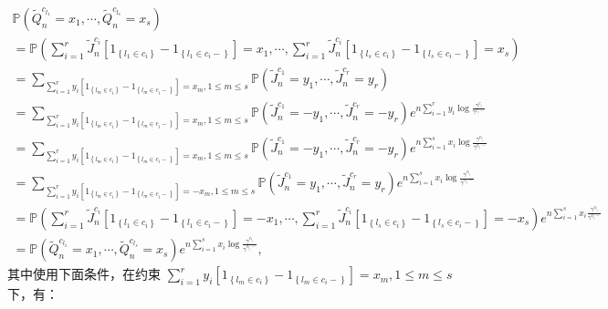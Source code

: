 \begin{equation*}
\begin{array}{l}
    \mathbb{P}\left(\tilde{Q}_{n}^{c_{l_{1}}}=x_{1}, \cdots, \tilde{Q}_{n}^{c_{l_{s}}}=x_{s}\right)\\
    =\mathbb{P}\left(\sum_{i=1}^{r} \tilde{J}_{n}^{c_{i}}\left[1_{\left\{l_{1} \in c_{i}\right\}}-1_{\left\{l_{1} \in c_{i}-\right\}}\right]=x_{1}, \cdots, \sum_{i=1}^{r} \tilde{J}_{n}^{c_{i}}\left[1_{\left\{l_{s} \in c_{i}\right\}}-1_{\left\{l_{s} \in c_{i}-\right\}}\right]=x_{s}\right)\\
    =\sum_{\sum_{i=1}^{r} y_{i}\left[1_{\left\{l_{m} \in c_{i}\right\}}-1_{\left\{l_{m} \in c_{i}-\right\}}\right]=x_{m}, 1 \leq m \leq s} \mathbb{P}\left(\tilde{J}_{n}^{c_{1}}=y_{1}, \cdots, \tilde{J}_{n}^{c_{r}}=y_{r}\right)\\
    =\sum_{\sum_{i=1}^{r} y_{i}\left[1_{\left\{l_{m} \in c_{i}\right\}}-1_{\left\{l_{m} \in c_{i}-\right\}}\right]=x_{m}, 1 \leq m \leq s} \mathbb{P}\left(\tilde{J}_{n}^{c_{1}}=-y_{1}, \cdots, \tilde{J}_{n}^{c_{r}}=-y_{r}\right) e^{n \sum_{i=1}^{r} y_{i} \log \frac{\gamma^{c_{i}}}{\gamma^{c_{i}-}}}\\
    =\sum_{\sum_{i=1}^{r} y_{i}\left[1_{\left\{l_{m} \in c_{i}\right\}}-1_{\left\{l_{m} \in c_{i}-\right\}}\right]=x_{m}, 1 \leq m \leq s} \mathbb{P}\left(\tilde{J}_{n}^{c_{1}}=-y_{1}, \cdots, \tilde{J}_{n}^{c_{r}}=-y_{r}\right) e^{n \sum_{i=1}^{s} x_{i} \log \frac{\gamma^{c_{l_i}}}{\gamma^{c_{l_i}-}}}\\
    =\sum_{\sum_{i=1}^{r} y_{i}\left[1_{\left\{l_{m} \in c_{i}\right\}}-1_{\left\{l_{m} \in c_{i}-\right\}}\right]=-x_{m}, 1 \leq m \leq s} \mathbb{P}\left(\tilde{J}_{n}^{c_{1}}=y_{1}, \cdots, \tilde{J}_{n}^{c_{r}}=y_{r}\right) e^{n \sum_{i=1}^{s} x_{i} \log \frac{\gamma^{c_{l_i}}}{\gamma^{c_{l_i}-}}}\\
    =\mathbb{P}\left(\sum_{i=1}^{r} \tilde{J}_{n}^{c_{i}}\left[1_{\left\{l_{1} \in c_{i}\right\}}-1_{\left\{l_{1} \in c_{i}-\right\}}\right]=-x_{1}, \cdots, \sum_{i=1}^{r} \tilde{J}_{n}^{c_{i}}\left[1_{\left\{l_{s} \in c_{i}\right\}}-1_{\left\{l_{s} \in c_{i}-\right\}}\right]=-x_{s}\right) e^{n \sum_{i=1}^{s} x_{i} \frac{\gamma^{c_{l_i}}}{\gamma^{c_{l_i}-}}}\\
    =\mathbb{P}\left(\tilde{Q}_{n}^{c_{l_{1}}}=x_{1}, \cdots, \tilde{Q}_{n}^{c_{l_{s}}}=x_{s}\right) e^{n \sum_{i=1}^{s} x_{i} \log \frac{\gamma^{c_{l_i}}}{\gamma^{c_{l_i}-}}},
\end{array}
\end{equation*}
其中使用下面条件，在约束 $\sum_{i=1}^{r} y_{i}\left[1_{\left\{l_{m} \in c_{i}\right\}}-1_{\left\{l_{m} \in c_{i}-\right\}}\right]=x_{m}, 1 \leq m \leq s$下，有：

